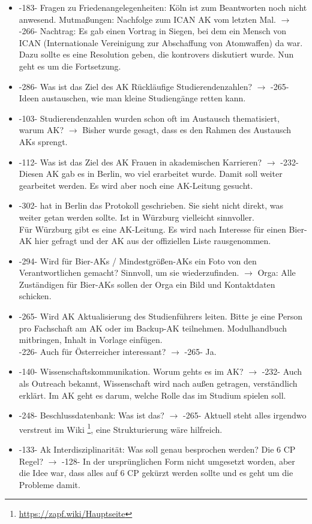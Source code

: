     \begin{itemize}
      \item -183- Fragen zu Friedenangelegenheiten: Köln ist zum Beantworten noch nicht anwesend. Mutmaßungen: Nachfolge zum ICAN AK vom letzten Mal.
        $\rightarrow$ -266- Nachtrag: Es gab einen Vortrag in Siegen, bei dem ein Mensch von ICAN (Internationale Vereinigung zur Abschaffung von Atomwaffen) da war. Dazu sollte es eine Resolution geben, die kontrovers diskutiert wurde. Nun geht es um die Fortsetzung.
      \item -286- Was ist das Ziel des AK Rückläufige Studierendenzahlen? $\rightarrow$ -265- Ideen austauschen, wie man kleine Studiengänge retten kann.
      \item -103- Studierendenzahlen wurden schon oft im Austausch thematisiert, warum AK? $\rightarrow$ Bisher wurde gesagt, dass es den Rahmen des Austausch AKs sprengt.
      \item -112- Was ist das Ziel des AK Frauen in akademischen Karrieren? $\rightarrow$ -232- Diesen AK gab es in Berlin, wo viel erarbeitet wurde. Damit soll weiter gearbeitet werden. Es wird aber noch eine AK-Leitung gesucht.
      \item -302- hat in Berlin das Protokoll geschrieben. Sie sieht nicht direkt, was weiter getan werden sollte. Ist in Würzburg vielleicht sinnvoller. \\
        Für Würzburg gibt es eine AK-Leitung. Es wird nach Interesse für einen Bier-AK hier gefragt und der AK aus der offiziellen Liste rausgenommen.
      \item -294- Wird für Bier-AKs / Mindestgrößen-AKs ein Foto von den Verantwortlichen gemacht? Sinnvoll, um sie wiederzufinden. $\rightarrow$ Orga: Alle Zuständigen für Bier-AKs sollen der Orga ein Bild und Kontaktdaten schicken.
      \item -265- Wird AK Aktualisierung des Studienführers leiten. Bitte je eine Person pro Fachschaft am AK oder im Backup-AK teilnehmen. Modulhandbuch mitbringen, Inhalt in Vorlage einfügen. \\
        -226- Auch für Österreicher interessant? $\rightarrow$ -265- Ja.
      \item -140- Wissenschaftskommunikation. Worum gehts es im AK? $\rightarrow$ -232- Auch als Outreach bekannt, Wissenschaft wird nach außen getragen, verständlich erklärt. Im AK geht es darum, welche Rolle das im Studium spielen soll.
      \item -248- Beschlussdatenbank: Was ist das? $\rightarrow$ -265- Aktuell steht alles irgendwo verstreut im Wiki \footnote{\url{https://zapf.wiki/Hauptseite}}, eine Strukturierung wäre hilfreich.
      \item -133- Ak Interdisziplinarität: Was soll genau besprochen werden? Die 6 CP Regel? $\rightarrow$ -128- In der ursprünglichen Form nicht umgesetzt worden, aber die Idee war, dass alles auf 6 CP gekürzt werden sollte und es geht um die Probleme damit.
    \end{itemize}

